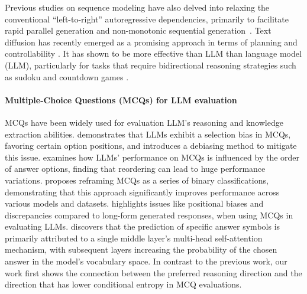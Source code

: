 Previous studies on sequence modeling have also delved into relaxing the conventional ``left-to-right'' autoregressive dependencies, primarily to facilitate rapid parallel generation \citep{gu2018non, ghazvininejad-etal-2019-mask,gu-kong-2021-fully,zhang-etal-2020-pointer} and non-monotonic sequential generation~\citep{welleck2019non,gu2019insertion}. Text diffusion has recently emerged as a promising approach in terms of planning and controllability \citep{Li-2022-DiffusionLM, zhang2023planner, gong2024scaling}. It has shown to be more effective than LLM than language model (LLM), particularly for tasks that require bidirectional reasoning strategies such as sudoku and countdown games \citep{ye2024beyond}.


\paragraph{Multiple-Choice Questions (MCQs) for LLM evaluation}
MCQs have been widely used for evaluation LLM's reasoning and knowledge extraction abilities. 
\citet{zheng2023large} demonstrates that LLMs exhibit a selection bias in MCQs, favoring certain option positions, and introduces a debiasing method to mitigate this issue.
\citet{pezeshkpour2023large} examines how LLMs’ performance on MCQs is influenced by the order of answer options, finding that reordering can lead to huge performance variations. 
\citet{ghosal2022two} proposes reframing MCQs as a series of binary classifications, demonstrating that this approach significantly improves performance across various models and datasets.
\citet{li2024can} highlights issues like positional biases and discrepancies compared to long-form generated responses, when using MCQs in evaluating LLMs.
\citet{wiegreffe2024answer} discovers that the prediction of specific answer symbols is primarily attributed to a single middle layer’s multi-head self-attention mechanism, with subsequent layers increasing the probability of the chosen answer in the model’s vocabulary space.
In contrast to the previous work, our work first shows the connection between the preferred reasoning direction and the direction that has lower conditional entropy in MCQ evaluations.